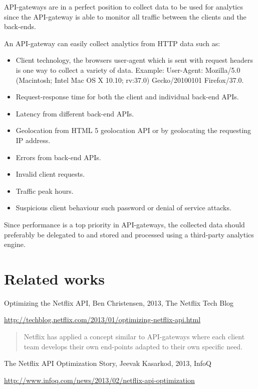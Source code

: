 \documentclass{cslthse-msc}
\begin{document}
API-gateways are in a perfect position to collect data to be used for analytics since the API-gateway is able to monitor all traffic between the clients and the back-ends. 

An API-gateway can easily collect analytics from HTTP data such as:
\begin{itemize}
	\item Client technology, the browsers user-agent which is sent with request headers is one way to collect a variety of data. Example: User-Agent: Mozilla/5.0 (Macintosh; Intel Mac OS X 10.10; rv:37.0) Gecko/20100101 Firefox/37.0.
	\item Request-response time for both the client and individual back-end APIs.
	\item Latency from different back-end APIs.
	\item Geolocation from HTML 5 geolocation API\cite{html5_geolocation} or by geolocating the requesting IP address.
	\item Errors from back-end APIs.
	\item Invalid client requests.
	\item Traffic peak hours.
	\item Suspicious client behaviour such password or denial of service attacks.
\end{itemize}

Since performance is a top priority in API-gateways, the collected data should preferably be delegated to and stored and processed using a third-party analytics engine.

\section{Related works}
Optimizing the Netflix API, Ben Christensen, 2013, The Netflix Tech Blog

\noindent \url{http://techblog.netflix.com/2013/01/optimizing-netflix-api.html}

\begin{quote}
	Netflix has applied a concept similar to API-gateways where each client team develops their own end-points adapted to their own specific need.
\end{quote}

\vspace{5mm}

\noindent The Netflix API Optimization Story, Jeevak Kasarkod, 2013, InfoQ

\noindent \url{http://www.infoq.com/news/2013/02/netflix-api-optimization}
\end{document}
